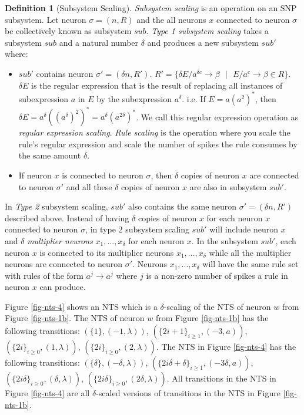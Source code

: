 \documentclass[]{elsarticle}
\theoremstyle{definition}
\newtheorem{definition2}{Definition}
\theoremstyle{definition}
\newcommand{\ra}{\rightarrow}
\newcommand{\se}{\text{ }}
\begin{document}
\begin{definition2}[Subsystem Scaling]
\emph{Subsystem scaling} is an operation on an SNP subsystem. Let neuron $\sigma=(n,R)$ and the all 
neurons $x$ connected to neuron $\sigma$ be collectively known as subsystem $sub$. \emph{Type 1 
subsystem scaling} takes a subsystem $sub$ and a natural number $\delta$ and produces a new 
subsystem $sub'$ where:
\begin{itemize}
   \item $sub'$ contains neuron $\sigma'=(\delta n, R')$. $R'=\{\delta E/a^{\delta c} \ra \beta\se|
         \se E/a^c\ra \beta \in R\}$. $\delta E$ is the regular expression that is the result of 
         replacing all instances of subexpression $a$ in $E$ by the subexpression $a^{\delta}$. i.e.
         If $E=a(a^2)^*$, then $\delta E = a^{\delta}((a^{\delta})^2)^* = a^{\delta}(a^{2\delta})^*$.
         We call this regular expression operation as \emph{regular expression scaling}. \emph{Rule
         scaling} is the operation where you scale the rule's regular expression and scale the
         number of spikes the rule consumes by the same amount $\delta$.
   \item If neuron $x$ is connected to neuron $\sigma$, then $\delta$ copies of neuron $x$ are
         connected to neuron $\sigma'$ and all these $\delta$ copies of neuron $x$ are also in 
         subsystem $sub'$. 
\end{itemize}

In \emph{Type 2} subsystem scaling, $sub'$ also contains the same neuron $\sigma'=(\delta n,R')$ 
described above. Instead of having $\delta$ copies of neuron $x$ for each neuron $x$ connected to
neuron $\sigma$, in type 2 subsystem scaling $sub'$ will include neuron $x$ and $\delta$ 
\emph{multiplier neurons} $x_1,...,x_{\delta}$ for each neuron $x$. In the subsystem $sub'$,
each neuron $x$ is connected to its multiplier neurons $x_1,...,x_{\delta}$ while all the multiplier
neurons are connected to neuron $\sigma'$. Neurons $x_1,...,x_{\delta}$ will have the same rule set 
with rules of the form $a^j\ra a^j$ where $j$ is a non-zero number of spikes a rule in neuron $x$ 
can produce. 
\end{definition2}


Figure \ref{fig-nts-4} shows an NTS which is a $\delta$-scaling of the NTS of neuron $w$ from 
Figure \ref{fig-nts-1b}. The NTS of neuron $w$ from Figure \ref{fig-nts-1b} has the following 
transitions: $(\{1\}, (-1,\lambda))$, $(\{2i+1\}_{i\geq 1},(-3,a))$,$(\{2i\}_{i\geq 0},(1,\lambda))$, 
$(\{2i\}_{i\geq 0},(2,\lambda))$. The NTS in Figure \ref{fig-nts-4} has the following transitions:
$(\{\delta\}, (-\delta,\lambda))$, $(\{2i\delta+\delta\}_{i\geq 1},(-3\delta,a))$,
$(\{2i\delta\}_{i\geq 0},(\delta,\lambda))$, $(\{2i\delta\}_{i\geq 0},(2\delta,\lambda))$. All 
transitions in the NTS in Figure \ref{fig-nts-4} are all $\delta$-scaled versions of transitions in
the NTS in Figure \ref{fig-nts-1b}.
\end{document}
